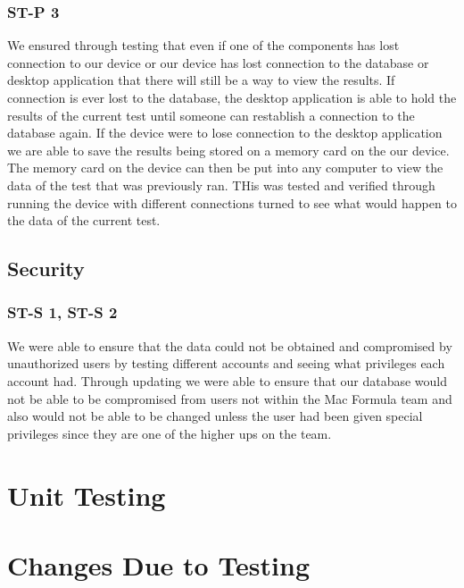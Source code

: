 \documentclass[12pt, titlepage]{article}
\begin{document}

\subsubsection{ST-P 3}
We ensured through testing that even if one of the components has lost connection to our device or our device has lost connection to the database or desktop application that there will still be a way to view the results. If connection is ever lost to the database, the desktop application is able to hold the results of the current test until someone can restablish a connection to the database again. If the device were to lose connection to the desktop application we are able to save the results being stored on a memory card on the our device. The memory card on the device can then be put into any computer to view the data of the test that was previously ran. THis was tested and verified through running the device with different connections turned to see what would happen to the data of the current test.

\subsection{Security}
\subsubsection{ST-S 1, ST-S 2}
We were able to ensure that the data could not be obtained and compromised by unauthorized users by testing different accounts and seeing what privileges each account had. Through updating we were able to ensure that our database would not be able to be compromised from users not within the Mac Formula team and also would not be able to be changed unless the user had been given special privileges since they are one of the higher ups on the team.

\section{Unit Testing}

\section{Changes Due to Testing}
\end{document}
